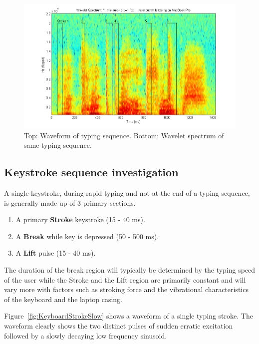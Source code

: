 \begin{figure}[!] %
\centering
\includegraphics[width=150mm]{waveletspectrumAno.png}
\caption{Top: Waveform of typing sequence. Bottom: Wavelet spectrum of same typing sequence.}\label{fig:waveletspectrumAno}
\end{figure}

\subsection{Keystroke sequence investigation}
A single keystroke, during rapid typing and not at the end of a typing sequence, is generally made up of 3 primary sections.
\begin{enumerate}
  \item A primary \textbf{Stroke} keystroke (15 - 40 ms).
  \item A \textbf{Break} while key is depressed (50 - 500 ms).
  \item A \textbf{Lift} pulse (15 - 40 ms).
\end{enumerate}
The duration of the break region will typically be determined by the typing speed of the user while the Stroke and the Lift region are primarily constant and will vary more with factors such as stroking force and the vibrational characteristics of the keyboard and the laptop casing.

Figure~\ref{fig:KeyboardStrokeSlow} shows a waveform of a single typing stroke. The waveform clearly shows the two distinct pulses of sudden erratic excitation followed by a slowly decaying low frequency sinusoid.

